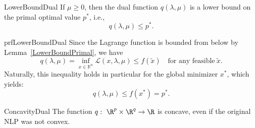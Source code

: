 \begin{lem}{LowerBoundDual}
    If $\mu \geq 0$, then the dual function $q(\lambda, \mu)$ is a lower bound on the primal optimal value $p^*$, i\@.e\@.,
    \begin{equation*}
        q(\lambda, \mu) \leq p^*.
    \end{equation*}
    \vspace*{-0.5cm}
\end{lem}

\begin{prf}{prfLowerBoundDual}
    Since the Lagrange function is bounded from below by Lemma~\ref{LowerBoundPrimal}, we have
    \begin{equation*}
        q(\lambda, \mu) = \inf_{x \in \mathbb{R}^n} \mathcal{L}(x, \lambda, \mu) \leq f(\tilde{x}) \quad \text{for any feasible} \ \tilde{x}.
    \end{equation*}
    Naturally, this inequality holds in particular for the global minimizer $x^*$, which yields:
    \begin{equation*}
        q(\lambda, \mu) \leq f(x^*) = p^*.
    \end{equation*}
    \vspace{-0.7cm}
\end{prf}

\begin{theo}{ConcavityDual}
    The function $q: \ \R^p \times \R^q \rightarrow \R$ is concave, even if the original NLP was not convex. 
\end{theo}

